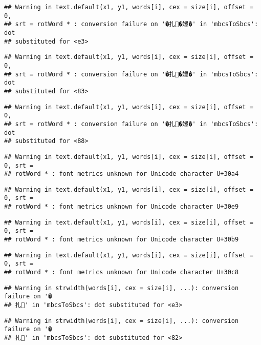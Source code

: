 \documentclass[]{article}
\begin{document}
\begin{verbatim}
## Warning in text.default(x1, y1, words[i], cex = size[i], offset = 0,
## srt = rotWord * : conversion failure on '�扎�嫘�' in 'mbcsToSbcs': dot
## substituted for <e3>
\end{verbatim}

\begin{verbatim}
## Warning in text.default(x1, y1, words[i], cex = size[i], offset = 0,
## srt = rotWord * : conversion failure on '�扎�嫘�' in 'mbcsToSbcs': dot
## substituted for <83>
\end{verbatim}

\begin{verbatim}
## Warning in text.default(x1, y1, words[i], cex = size[i], offset = 0,
## srt = rotWord * : conversion failure on '�扎�嫘�' in 'mbcsToSbcs': dot
## substituted for <88>
\end{verbatim}

\begin{verbatim}
## Warning in text.default(x1, y1, words[i], cex = size[i], offset = 0, srt =
## rotWord * : font metrics unknown for Unicode character U+30a4
\end{verbatim}

\begin{verbatim}
## Warning in text.default(x1, y1, words[i], cex = size[i], offset = 0, srt =
## rotWord * : font metrics unknown for Unicode character U+30e9
\end{verbatim}

\begin{verbatim}
## Warning in text.default(x1, y1, words[i], cex = size[i], offset = 0, srt =
## rotWord * : font metrics unknown for Unicode character U+30b9
\end{verbatim}

\begin{verbatim}
## Warning in text.default(x1, y1, words[i], cex = size[i], offset = 0, srt =
## rotWord * : font metrics unknown for Unicode character U+30c8
\end{verbatim}

\begin{verbatim}
## Warning in strwidth(words[i], cex = size[i], ...): conversion failure on '�
## 扎' in 'mbcsToSbcs': dot substituted for <e3>
\end{verbatim}

\begin{verbatim}
## Warning in strwidth(words[i], cex = size[i], ...): conversion failure on '�
## 扎' in 'mbcsToSbcs': dot substituted for <82>
\end{verbatim}
\end{document}
